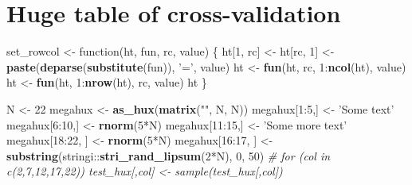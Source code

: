 \documentclass[]{article}
\newenvironment{Shaded}{\begin{snugshade}}{\end{snugshade}}
\newcommand{\KeywordTok}[1]{\textcolor[rgb]{0.13,0.29,0.53}{\textbf{{#1}}}}
\newcommand{\DecValTok}[1]{\textcolor[rgb]{0.00,0.00,0.81}{{#1}}}
\newcommand{\StringTok}[1]{\textcolor[rgb]{0.31,0.60,0.02}{{#1}}}
\newcommand{\CommentTok}[1]{\textcolor[rgb]{0.56,0.35,0.01}{\textit{{#1}}}}
\newcommand{\NormalTok}[1]{{#1}}
\begin{document}
\FloatBarrier

\section{Huge table of
cross-validation}\label{huge-table-of-cross-validation}

\begin{Shaded}
\begin{Highlighting}[]
\NormalTok{set_rowcol <-}\StringTok{ }\NormalTok{function(ht, fun, rc, value) \{}
  \NormalTok{ht[}\DecValTok{1}\NormalTok{, rc] <-}\StringTok{ }\NormalTok{ht[rc, }\DecValTok{1}\NormalTok{] <-}\StringTok{ }\KeywordTok{paste}\NormalTok{(}\KeywordTok{deparse}\NormalTok{(}\KeywordTok{substitute}\NormalTok{(fun)), }\StringTok{'='}\NormalTok{, value)}
  \NormalTok{ht <-}\StringTok{ }\KeywordTok{fun}\NormalTok{(ht, rc, }\DecValTok{1}\NormalTok{:}\KeywordTok{ncol}\NormalTok{(ht), value)}
  \NormalTok{ht <-}\StringTok{ }\KeywordTok{fun}\NormalTok{(ht, }\DecValTok{1}\NormalTok{:}\KeywordTok{nrow}\NormalTok{(ht), rc, value)}
  \NormalTok{ht}
\NormalTok{\}}

\NormalTok{N <-}\StringTok{ }\DecValTok{22}
\NormalTok{megahux <-}\StringTok{ }\KeywordTok{as_hux}\NormalTok{(}\KeywordTok{matrix}\NormalTok{(}\StringTok{""}\NormalTok{, N, N))}
\NormalTok{megahux[}\DecValTok{1}\NormalTok{:}\DecValTok{5}\NormalTok{,] <-}\StringTok{ 'Some text'}
\NormalTok{megahux[}\DecValTok{6}\NormalTok{:}\DecValTok{10}\NormalTok{,] <-}\StringTok{ }\KeywordTok{rnorm}\NormalTok{(}\DecValTok{5}\NormalTok{*N)}
\NormalTok{megahux[}\DecValTok{11}\NormalTok{:}\DecValTok{15}\NormalTok{,] <-}\StringTok{ 'Some more text'}
\NormalTok{megahux[}\DecValTok{18}\NormalTok{:}\DecValTok{22}\NormalTok{, ] <-}\StringTok{ }\KeywordTok{rnorm}\NormalTok{(}\DecValTok{5}\NormalTok{*N)}
\NormalTok{megahux[}\DecValTok{16}\NormalTok{:}\DecValTok{17}\NormalTok{, ] <-}\StringTok{ }\KeywordTok{substring}\NormalTok{(stringi::}\KeywordTok{stri_rand_lipsum}\NormalTok{(}\DecValTok{2}\NormalTok{*N), }\DecValTok{0}\NormalTok{, }\DecValTok{50}\NormalTok{)}
\CommentTok{# for (col in c(2,7,12,17,22)) test_hux[,col] <- sample(test_hux[,col])}



\end{Highlighting}
\end{Shaded}
\end{document}
